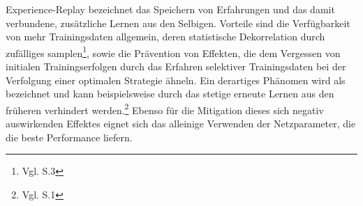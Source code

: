 Experience-Replay bezeichnet das Speichern von Erfahrungen und das damit verbundene, zusätzliche Lernen aus den Selbigen. Vorteile sind die Verfügbarkeit von mehr Trainingsdaten allgemein, deren statistische Dekorrelation durch zufälliges samplen\footnote{Vgl. \cite{dqn_implementation} S.3}, sowie die Prävention von Effekten, die dem Vergessen von initialen Trainingserfolgen durch das Erfahren selektiver Trainingsdaten bei der Verfolgung einer optimalen Strategie ähneln. Ein derartiges Phänomen wird als  bezeichnet und kann beispielsweise durch das stetige erneute Lernen aus den früheren  verhindert werden.\footnote{Vgl. \cite{experience_replay_continual_learning} S.1} Ebenso für die Mitigation dieses sich negativ auswirkenden Effektes eignet sich das alleinige Verwenden der Netzparameter, die die beste Performance liefern.


